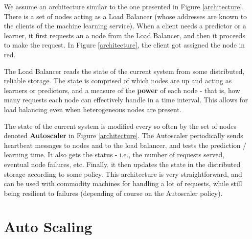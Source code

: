 \documentclass[12pt]{article}
\begin{document}
We assume an architecture similar to the one presented in Figure
\ref{architecture}. There is a set of nodes acting as a Load Balancer
(whose addresses are known to the clients of the machine learning service). When
a client needs a predictor or a learner, it first requests an a node from the
Load Balancer, and then it proceeds to make the request. In Figure
\ref{architecture}, the client got assigned the node in red.

The Load Balancer reads the state of the current system from some distributed,
reliable storage. The state is comprised of which nodes are up and acting as
learners or predictors, and a measure of the \textbf{power} of each node - that
is, how many requests each node can effectively handle in a time interval. This
allows for load balancing even when heterogeneous nodes are present.

The state of the current system is modified every so often by the set of nodes
denoted \textbf{Autoscaler} in Figure \ref{architecture}. The Autoscaler
periodically sends heartbeat messages to nodes and to the load balancer, and
tests the prediction / learning time. It also gets the status - i.e., the number
of requests served, eventual node failures, etc.  Finally, it then updates the
state in the distributed storage according to some policy. This architecture is
very straightforward, and can be used with commodity machines for handling a lot
of requests, while still being resilient to failures (depending of course on the
Autoscaler policy).

\section{Auto Scaling}
\end{document}
